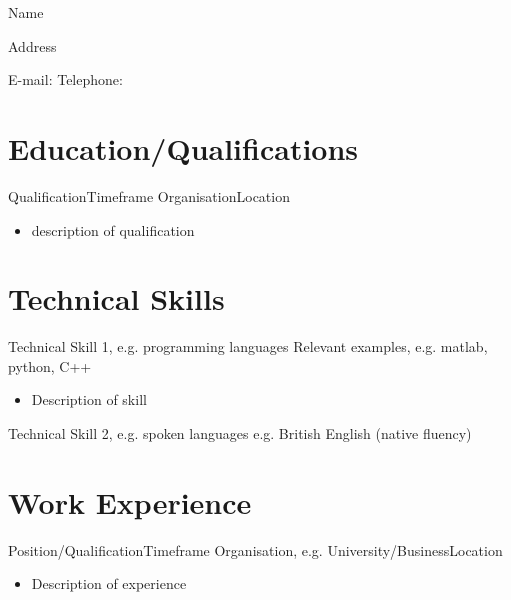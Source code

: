 \documentclass{articleCV}
\begin{document}
\begin{centering}
  {\Huge Name \par}
  \vspace{0.5\baselineskip}
  Address \par
  \vspace{0.5\baselineskip}
  E-mail: \email \hspace{0.5em} Telephone: \phone \par
\end{centering}

\vspace{\baselineskip}

\section{Education/Qualifications}

  \tab %
  {Qualification}{Timeframe} 	%
  {Organisation}{Location}	%
    \begin{itemize}
    \item description of qualification
    \end{itemize}


\section{Technical Skills}

  \tab %
  {Technical Skill 1, e.g. programming languages}{}
  {Relevant examples, e.g. matlab, python, C++}{}
    \begin{itemize}
    \item Description of skill
    \end{itemize}
    
  \tab %
  {Technical Skill 2, e.g. spoken languages}{}
  {e.g. British English (native fluency)}{}


\section{Work Experience}

  \tab %
  {Position/Qualification}{Timeframe}
  {Organisation, e.g. University/Business}{Location}
    \begin{itemize}
    \item Description of experience
    \end{itemize}
\end{document}
